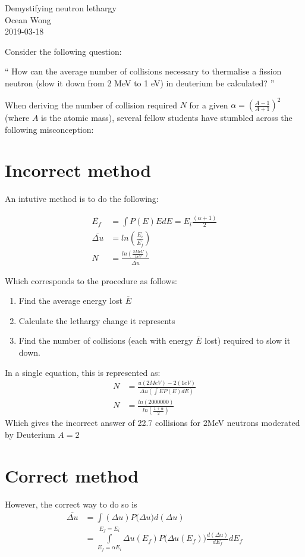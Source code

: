 \documentclass[a4paper, 12pt]{article}
\begin{document}
\begin{center}
Demystifying neutron lethargy			\\
Ocean Wong								\\
2019-03-18
\end{center}

Consider the following question:

`` 
How can the average number of collisions necessary to thermalise a fission neutron (slow
it down from 2 MeV to 1 eV) in deuterium be calculated?
'' 

When deriving the number of collision required $N$ for a given $\alpha = (\frac{A-1}{A+1})^2$ (where $A$ is the atomic mass), several fellow students have stumbled across the following misconception:

\section{Incorrect method}\label{Incorrect}
An intutive method is to do the following:

\begin{align}
	\overline{E_f} &= \int P(E) E dE =  {E_i} \frac{(\alpha+1)}{2} \\
	\overline{\Delta u} &= ln \left( \frac{E_i}{\overline{E_f}} \right)	\\
	N &= \frac{ ln \left( \frac{2 MeV}{1eV} \right)} { \overline{\Delta u} }
\end{align}

Which corresponds to the procedure as follows:
\begin{enumerate}
	\item Find the average energy lost $\overline{E}$
	\item Calculate the lethargy change it represents
	\item Find the number of collisions (each with energy $\overline{E}$ lost) required to slow it down.
\end{enumerate}

In a single equation, this is represented as:
\begin{align}
	N&=\frac{u(2MeV) - 2(1eV)}{\Delta u \left(\int E P(E) dE \right) }\\
	N&=\frac{ln\left(2000000\right)}{ln\left(\frac{1+\alpha}{2} \right)}
\end{align}
Which gives the incorrect answer of 22.7 collisions for 2MeV neutrons moderated by Deuterium $A=2$

\section{Correct method} \label{Correct}
	However, the correct way to do so is 
\begin{align}
	\overline{\Delta u} &= \int (\Delta u) P\big(\Delta u \big) d(\Delta u)	\\
		&= \int\limits_{E_f=\alpha E_i}^{E_f=E_i} \Delta u (E_f) P\big(\Delta u (E_f) \big) \frac{d(\Delta u)}{dE_f} dE_f \label{scaleUprob}
\end{align}
\end{document}
